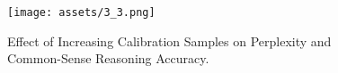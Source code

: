\begin{figure}[ht]
\begin{center}
\centerline{\texttt{[image: assets/3\_3.png]}}
\caption{Effect of Increasing Calibration Samples on Perplexity and Common-Sense Reasoning Accuracy. }
\label{Increasing Calibration Samples using SLEB algo}

\end{center}

\end{figure}